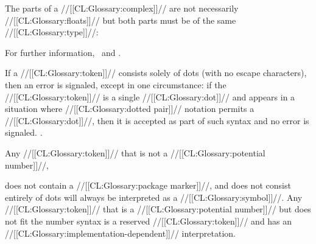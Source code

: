 The parts of a //[[CL:Glossary:complex]]// are not necessarily //[[CL:Glossary:floats]]//  but both parts must be of the same //[[CL:Glossary:type]]//:  %

For further information, \seesection\SharpsignC\ and \secref\PrintingComplexes.

\endsubsubsection%

\endsubsection%


If a //[[CL:Glossary:token]]// consists solely of dots (with no escape characters), then an error  is signaled, except in one circumstance: if the //[[CL:Glossary:token]]// is a single //[[CL:Glossary:dot]]// and appears in a situation where //[[CL:Glossary:dotted pair]]// notation permits a //[[CL:Glossary:dot]]//, then it is accepted as part of such syntax and no error is signaled.  \Seesection\LeftParen.

\endsubsection%

 

Any //[[CL:Glossary:token]]// that is not a //[[CL:Glossary:potential number]]//,

does not contain a //[[CL:Glossary:package marker]]//, and does not consist entirely of dots will always be interpreted as a //[[CL:Glossary:symbol]]//. Any //[[CL:Glossary:token]]// that is a //[[CL:Glossary:potential number]]// but does not fit the        number syntax is a reserved //[[CL:Glossary:token]]// and has an //[[CL:Glossary:implementation-dependent]]// interpretation.

